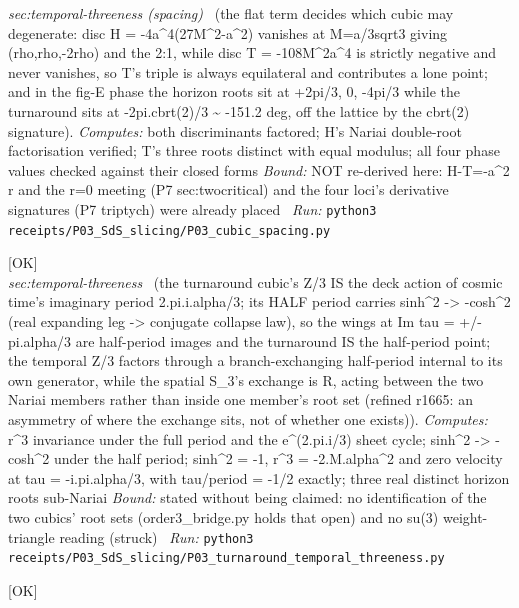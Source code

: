 \begin{description}
\textit{sec:temporal-threeness (spacing)} \ (the flat term decides which cubic may degenerate: disc H = -4a\textasciicircum{}4(27M\textasciicircum{}2-a\textasciicircum{}2) vanishes at M=a/3sqrt3 giving (rho,rho,-2rho) and the 2:1, while disc T = -108M\textasciicircum{}2a\textasciicircum{}4 is strictly negative and never vanishes, so T's triple is always equilateral and contributes a lone point; and in the fig-E phase the horizon roots sit at +2pi/3, 0, -4pi/3 while the turnaround sits at -2pi.cbrt(2)/3 \textasciitilde{} -151.2 deg, off the lattice by the cbrt(2) signature). 
\emph{Computes:} both discriminants factored; H's Nariai double-root factorisation verified; T's three roots distinct with equal modulus; all four phase values checked against their closed forms
 \emph{Bound:} NOT re-derived here: H-T=-a\textasciicircum{}2 r and the r=0 meeting (P7 sec:twocritical) and the four loci's derivative signatures (P7 triptych) were already placed
\ \emph{Run:} \texttt{python3 receipts/P03\_SdS\_slicing/P03\_cubic\_spacing.py}
\item[\label{rcpt:P03_turnaround_temporal_threeness}\texttt{P03\_turnaround\_temporal\_threeness}]\hfill\textsf{[OK]}\\
\textit{sec:temporal-threeness} \ (the turnaround cubic's Z/3 IS the deck action of cosmic time's imaginary period 2.pi.i.alpha/3; its HALF period carries sinh\textasciicircum{}2 -> -cosh\textasciicircum{}2 (real expanding leg -> conjugate collapse law), so the wings at Im tau = +/- pi.alpha/3 are half-period images and the turnaround IS the half-period point; the temporal Z/3 factors through a branch-exchanging half-period internal to its own generator, while the spatial S\_3's exchange is R, acting between the two Nariai members rather than inside one member's root set (refined r1665: an asymmetry of where the exchange sits, not of whether one exists)). 
\emph{Computes:} r\textasciicircum{}3 invariance under the full period and the e\textasciicircum{}(2.pi.i/3) sheet cycle; sinh\textasciicircum{}2 -> -cosh\textasciicircum{}2 under the half period; sinh\textasciicircum{}2 = -1, r\textasciicircum{}3 = -2.M.alpha\textasciicircum{}2 and zero velocity at tau = -i.pi.alpha/3, with tau/period = -1/2 exactly; three real distinct horizon roots sub-Nariai
 \emph{Bound:} stated without being claimed: no identification of the two cubics' root sets (order3\_bridge.py holds that open) and no su(3) weight-triangle reading (struck)
\ \emph{Run:} \texttt{python3 receipts/P03\_SdS\_slicing/P03\_turnaround\_temporal\_threeness.py}
\item[\label{rcpt:P16_nariai_welds}\texttt{P16\_nariai\_welds}]\hfill\textsf{[OK]}\\

\end{description}
